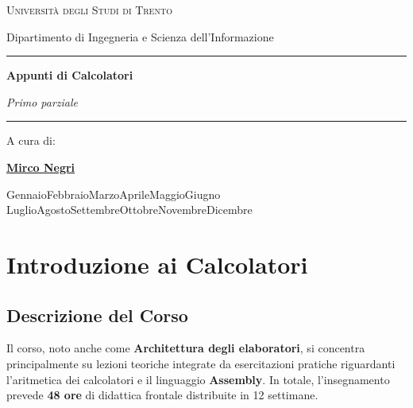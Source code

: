 \documentclass[12pt, a4paper]{article}
\begin{document}
\begin{titlepage}
    \centering
    \vspace*{3cm} 
    
    {\scshape\LARGE Università degli Studi di Trento \par}
    \vspace{0.5cm}
    {\large Dipartimento di Ingegneria e Scienza dell'Informazione \par}
    
    \vspace{2cm}
    
    \rule{\textwidth}{0.8pt}\vspace{0.5cm}
    {\Huge\bfseries Appunti di Calcolatori \par}
    \vspace{0.3cm}
    {\Large\itshape Primo parziale \par}
    \vspace{0.4cm}\rule{\textwidth}{0.8pt}
    
    \vspace{3cm}
    
    {\Large A cura di: \par}
    \vspace{0.3cm}
    {\Large \textbf{\href{https://github.com/mirconegri}{Mirco Negri}} \par}
    
    \vfill
    
    {\large
    \ifcase\month\or
    Gennaio\or Febbraio\or Marzo\or Aprile\or Maggio\or Giugno\or
    Luglio\or Agosto\or Settembre\or Ottobre\or Novembre\or Dicembre\fi
    \space \the\year \par
    }
\end{titlepage}

\tableofcontents
\newpage


\section{Introduzione ai Calcolatori}

\subsection{Descrizione del Corso}
Il corso, noto anche come \textbf{Architettura degli elaboratori}, si concentra principalmente su lezioni teoriche integrate da esercitazioni pratiche riguardanti l'aritmetica dei calcolatori e il linguaggio \textbf{Assembly}. In totale, l'insegnamento prevede \textbf{48 ore} di didattica frontale distribuite in 12 settimane.
\end{document}

